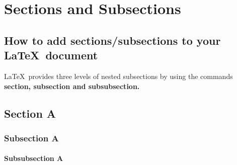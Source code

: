 

\chapter{Sections and Subsections}  

\section{How to add sections/subsections to your \LaTeX\ document}


\noindent \LaTeX\ provides three levels of nested subsections by using the commands \textbf{section, subsection and subsubsection.} %

\section{Section A}
\noindent \lipsum[1][1] %

\subsection{Subsection A}
\noindent \lipsum[1][1] %

\subsubsection{Subsubsection A}
\noindent \lipsum[1][1] %


